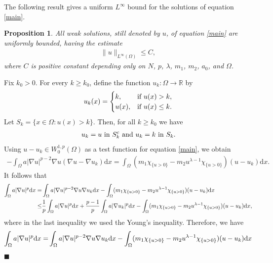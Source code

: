 \documentclass[onecolumn]{autart}
\newtheorem{proposition}{Proposition}
\newenvironment{proof}{{\it Proof: \enspace}}{\hfill $\blacksquare$\par}
\begin{document}
	The following result gives a uniform $L^{\infty}$ bound for the solutions of equation \eqref{main}.
	\begin{proposition}\label{exi-2}
		All weak solutions, still denoted by $u$, of equation \eqref{main} are uniformly bounded, having the estimate
		\begin{align*}
			\|u\|_{L^{\infty}(\Omega)}\leq C,
		\end{align*}
		where $C$ is positive constant  depending only on   $N$, $p$, $\lambda$, $m_1$, $m_2$,  $a_0$,  and $\Omega$.
	\end{proposition}
	\begin{proof}
		Fix $k_0 > 0$. For every $k \geq k_0$, define the function $u_k : \Omega \to \mathbb{R}$ by
		\begin{align}
			u_k(x) =
			\begin{cases}
				k  , & \text{if }  u(x)  > k, \\
				u(x), & \text{if }  u(x)  \leq k.
			\end{cases}\notag
		\end{align}
		Let $S_k = \{ x \in \Omega :  u(x)  > k \}$. Then,   for all $k \geq k_0$ we have
		\begin{align}
			u_k = u  \text{  in  } S_k^c  \text{  and  }  u_k = k   \text{  in  } S_k.\notag
		\end{align}
		Using $u-u_k\in W^{1,p}_0(\Omega)$ as a test function for equation   \eqref{main}, we obtain
		\begin{align*}
			- \int_{\Omega}a|\nabla u|^{p-2}\nabla u (\nabla u -\nabla u_k)\mathrm{d}x= \int_{\Omega} (m_1 \chi_{\{u>0\}} - m_2 u^{\lambda - 1} \chi_{\{u > 0\}}  )(u-u_k) \mathrm{d}x.
		\end{align*}
		It follows that
		\begin{align*}
			\int_{\Omega}a|\nabla u|^{p } \mathrm{d}x=& \int_{\Omega}a|\nabla u|^{p-2}\nabla u  \nabla u_k \mathrm{d}x -\int_{\Omega} (m_1 \chi_{\{u>0\}} - m_2 u^{\lambda - 1} \chi_{\{u > 0\}}  )(u-u_k) \mathrm{d}x \notag\\
			\leq & \frac{1}{p}\int_{\Omega}a|\nabla u|^{p }  \mathrm{d}x + \frac{p-1}{p}\int_{\Omega}a|\nabla u_k|^{p }  \mathrm{d}x
			-\int_{\Omega} (m_1 \chi_{\{u>0\}} - m_2 u^{\lambda - 1} \chi_{\{u > 0\}}  )(u-u_k) \mathrm{d}x,
		\end{align*}
		where in the last inequality we used the Young's inequality. Therefore, we have
		\begin{align*}
			\int_{\Omega}a|\nabla u|^{p } \mathrm{d}x=& \int_{\Omega}a|\nabla u|^{p-2}\nabla u  \nabla u_k \mathrm{d}x -\int_{\Omega} (m_1 \chi_{\{u>0\}} - m_2 u^{\lambda - 1} \chi_{\{u > 0\}}  )(u-u_k) \mathrm{d}x \notag\\

\end{align*}
\end{proof}
\end{document}
